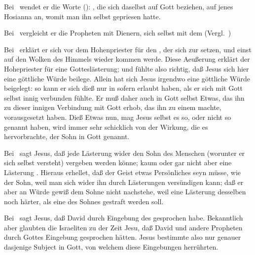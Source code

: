 \begin{aufza}
\begin{aufzb}
\begin{aufzc}
\item Bei \ wendet er die Worte (): , die sich daselbst auf Gott beziehen, auf jenes Hosianna an, womit man ihn selbst gepriesen hatte.
\item Bei \ vergleicht er die Propheten mit Dienern, sich selbst mit dem  (Vergl.\ )
\item Bei \ erklärt er sich vor dem Hohenpriester für den , der sich zur  setzen, und einst auf den Wolken des Himmels wieder kommen werde. Diese Aeußerung erklärt der Hohepriester für eine Gotteslästerung; und fühlte also richtig, daß Jesus sich hier eine göttliche Würde beilege. Allein hat sich Jesus irgendwo eine göttliche Würde beigelegt: so kann er sich dieß nur in sofern erlaubt haben, als er sich mit Gott selbst innig verbunden fühlte. Er muß daher auch in Gott selbst Etwas, das ihn zu dieser innigen Verbindung mit Gott erhob, das ihn zu einem  machte, vorausgesetzt haben. Dieß Etwas nun, mag Jesus selbst es so, oder nicht so genannt haben, wird immer sehr schicklich von der Wirkung, die es hervorbrachte, der Sohn in Gott genannt.~
\end{aufzc}
\item {}
\begin{aufzc}
\item Bei \ sagt Jesus, daß jede Lästerung wider den Sohn des Menschen (worunter er sich selbst versteht) vergeben werden könne; kaum oder gar nicht aber eine Lästerung . Hieraus erhellet, daß der Geist etwas Persönliches seyn müsse, wie der Sohn, weil man sich wider ihn durch Lästerungen versündigen kann; daß er aber an Würde gewiß dem Sohne nicht nachstehe, weil eine Lästerung desselben noch härter, als eine des Sohnes gestraft werden soll.
\item Bei \ sagt Jesus, daß David durch Eingebung des  gesprochen habe. Bekanntlich aber glaubten die Israeliten zu der Zeit Jesu, daß David und andere Propheten durch Gottes Eingebung gesprochen hätten. Jesus bestimmte also nur genauer dasjenige Subject in Gott, von welchem diese Eingebungen herrührten. \Usw\
\end{aufzc}
\end{aufzb}
\end{aufza}

